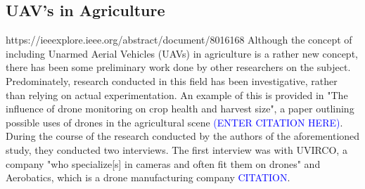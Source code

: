 \subsection{UAV's in Agriculture}
https://ieeexplore.ieee.org/abstract/document/8016168
Although the concept of including Unarmed Aerial Vehicles (UAVs) in agriculture is a rather new concept, there has been some preliminary work done by other researchers on the subject.
Predominately, research conducted in this field has been investigative, rather than relying on actual experimentation.
An example of this is provided in "The influence of drone monitoring on crop health and harvest size", a paper outlining possible uses of drones in the agricultural scene \textcolor{blue}{(ENTER CITATION HERE)}.
During the course of the research conducted by the authors of the aforementioned study, they conducted two interviews. The first interview was with UVIRCO, a company "who specialize[s] in cameras and often fit them on drones" and Aerobatics, which is a drone manufacturing company \textcolor{blue}{CITATION}. 